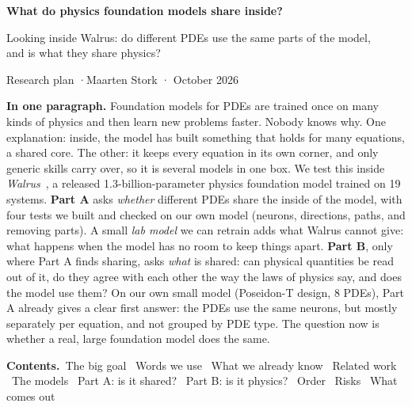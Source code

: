 \documentclass[11pt,a4paper]{article}
\begin{document}
\begin{center}
  \vspace*{1.5cm}
  {\LARGE\bfseries\color{ink} What do physics foundation models share inside?\par}
  \vspace{0.8em}
  {\large\color{muted} Looking inside Walrus: do different PDEs use the same parts of the model,\\and is what they share physics?\par}
  \vspace{2em}
  {\normalsize Research plan \quad·\quad Maarten Stork \quad· October 2026\par}
  \vspace{1.5em}
\end{center}

\begin{center}
\begin{minipage}{0.86\textwidth}
\small
\textbf{In one paragraph.}
Foundation models for PDEs are trained once on many kinds of physics and then learn new problems faster.
Nobody knows why. One explanation: inside, the model has built something that holds for many equations, a shared core.
The other: it keeps every equation in its own corner, and only generic skills carry over, so it is several models in one box.
We test this inside \emph{Walrus}~\cite{walrus}, a released 1.3-billion-parameter physics foundation model trained on 19 systems.
\textbf{Part A} asks \emph{whether} different PDEs share the inside of the model, with four tests we built and checked on our own
model (neurons, directions, paths, and removing parts). A small \emph{lab model} we can retrain adds what Walrus cannot give:
what happens when the model has no room to keep things apart.
\textbf{Part B}, only where Part A finds sharing, asks \emph{what} is shared: can physical quantities be read out of it,
do they agree with each other the way the laws of physics say, and does the model use them?
On our own small model (Poseidon-T design, 8 PDEs), Part A already gives a clear first answer: the PDEs use the same neurons,
but mostly separately per equation, and not grouped by PDE type. The question now is whether a real, large foundation model does the same.
\end{minipage}
\end{center}

\vspace{1.2em}
\begin{center}
\begin{minipage}{0.86\textwidth}
\small\color{muted}
\textbf{Contents.}~The big goal ~Words we use ~What we already know ~Related work ~The models ~Part A: is it shared? ~Part B: is it physics? ~Order ~Risks ~What comes out
\end{minipage}
\end{center}
\end{document}

